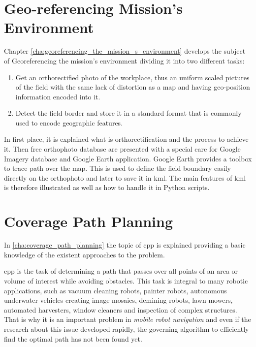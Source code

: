 \section{Geo-referencing Mission's Environment} %
\label{sec:geo_referencing_mission_s_environment}
Chapter \ref{cha:georeferencing_the_mission_s_environment} develops the subject of Georeferencing the mission's environment dividing it into two different tasks: 
\begin{enumerate}
  \item Get an orthorectified photo of the workplace, thus an uniform scaled pictures of the field with the same lack of distortion as a map and having geo-position information encoded into it.
  \item Detect the field border and store it in a standard format that is commonly used to encode geographic features.
\end{enumerate}
In first place, it is explained what is orthorectification and the process to achieve it. Then free orthophoto database are presented with a special care for Google Imagery database and Google Earth application.
Google Earth provides a toolbox to trace path over the map. This is used to define the field boundary easily directly on the orthophoto and later to save it in \acrfull{kml}. The main features of \acrshort{kml} is therefore illustrated as well as how to handle it in Python scripts.


\section{Coverage Path Planning} %
\label{sec:coverage_path_planning}
In \autoref{cha:coverage_path_planning} the topic of \acrfull{cpp} is explained providing a basic knowledge of the existent approaches to the problem.\par
\acrlong{cpp} is the task of determining a path that passes over all points of an area or volume of interest while avoiding obstacles. This task is integral to many robotic applications, such as vacuum cleaning robots, painter robots, autonomous underwater vehicles creating image mosaics, demining robots, lawn mowers, automated harvesters, window cleaners and inspection of complex structures. That is why it is an important problem in \textit{mobile robot navigation} and even if the research about this issue developed rapidly, the governing algorithm to efficiently find the optimal path has not been found yet.
